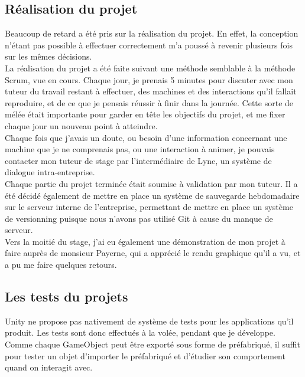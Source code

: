 \documentclass[a4paper]{article}
\begin{document}
    \subsection{Réalisation du projet}

    Beaucoup de retard a été pris sur la réalisation du projet. En effet, la conception n'étant pas possible à effectuer correctement m'a poussé à revenir plusieurs fois sur les mêmes décisions. \\

    La réalisation du projet a été faite suivant une méthode semblable à la méthode Scrum, vue en cours. Chaque jour, je prenais 5 minutes pour discuter avec mon tuteur du travail restant à effectuer, des machines et des interactions qu'il fallait reproduire, et de ce que je pensais réussir à finir dans la journée. Cette sorte de mélée était importante pour garder en tête les objectifs du projet, et me fixer chaque jour un nouveau point à atteindre. \\

    Chaque fois que j'avais un doute, ou besoin d'une information concernant une machine que je ne comprenais pas, ou une interaction à animer, je pouvais contacter mon tuteur de stage par l'intermédiaire de Lync, un système de dialogue intra-entreprise. \\

    Chaque partie du projet terminée était soumise à validation par mon tuteur. Il a été décidé également de mettre en place un système de sauvegarde hebdomadaire sur le serveur interne de l'entreprise, permettant de mettre en place un système de versionning puisque nous n'avons pas utilisé Git à cause du manque de serveur. \\

    Vers la moitié du stage, j'ai eu également une démonstration de mon projet à faire auprès de monsieur Payerne, qui a apprécié le rendu graphique qu'il a vu, et a pu me faire quelques retours. \\

    \subsection{Les tests du projets}

    Unity ne propose pas nativement de système de tests pour les applications qu'il produit. Les tests sont donc effectués à la volée, pendant que je développe. Comme chaque GameObject peut être exporté sous forme de préfabriqué, il suffit pour tester un objet d'importer le préfabriqué et d'étudier son comportement quand on interagit avec.
\end{document}
